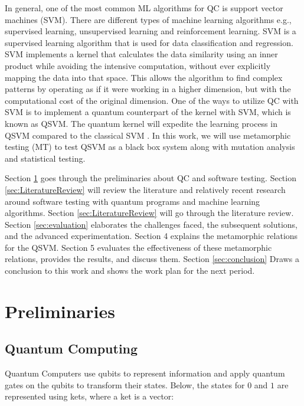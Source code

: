 \documentclass[12pt,a4paper]{article}
\begin{document}
	In general, one of the most common ML algorithms for QC is support vector machines (SVM). There are different types of machine learning algorithms e.g., supervised learning, unsupervised learning and reinforcement learning. SVM is a supervised learning algorithm that is used for data classification and regression. SVM implements a kernel that calculates the data similarity using an inner product while avoiding the intensive computation, without ever explicitly mapping the data into that space. This allows the algorithm to find complex patterns by operating as if it were working in a higher dimension, but with the computational cost of the original dimension. One of the ways to utilize QC with SVM is to implement a quantum counterpart of the kernel with SVM, which is known as QSVM. The quantum kernel will expedite the learning process in QSVM compared to the classical SVM \cite{Rebentrost_2014} \cite{Gentinetta_2024}. In this work, we will use metamorphic testing (MT) to test QSVM as a black box system along with mutation analysis and statistical testing. 
	
	Section \ref{sec:preliminaries} goes through the preliminaries about QC and software testing.  Section \ref{sec:LiteratureReview} will review the literature and relatively recent research around software testing with quantum programs and machine learning algorithms. Section \ref{sec:LiteratureReview} will go through the literature review. Section \ref{sec:evaluation} elaborates the challenges faced, the subsequent solutions, and the advanced experimentation. Section 4 explains the metamorphic relations for the QSVM. Section 5 evaluates the effectiveness of these metamorphic relations, provides the results, and discuss them. Section \ref{sec:conclusion} Draws a conclusion to this work and shows the work plan for the next period.
	
	
	\section {Preliminaries}
	\label{sec:preliminaries}
	
	\subsection{Quantum Computing}
	
	Quantum Computers use qubits to represent information and apply quantum gates  on the qubits to transform their states. Below, the states for $0$ and $1$ are represented using kets, where a ket is a vector:
	
\end{document}
